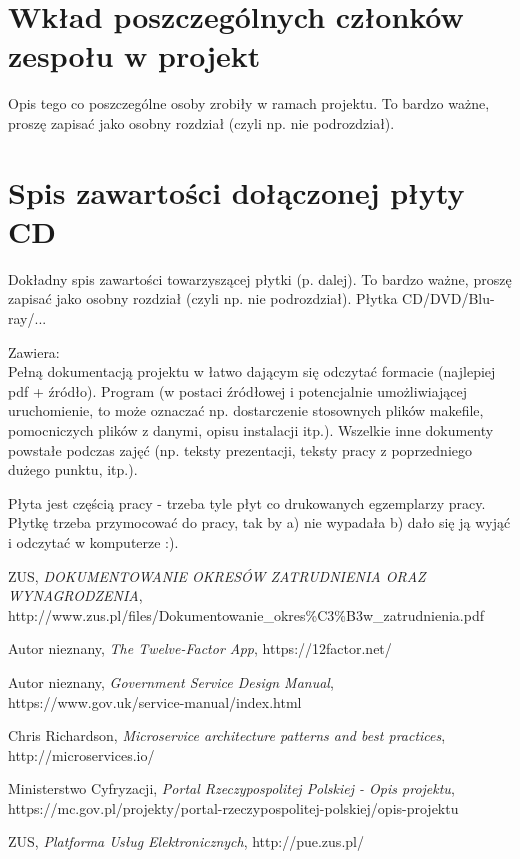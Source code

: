 \documentclass[licencjacka]{pracamgr}
\begin{document}
\chapter{Wkład poszczególnych członków zespołu w projekt}\label{r:wklad}
Opis tego co poszczególne osoby zrobiły w ramach projektu. To bardzo ważne, proszę zapisać jako osobny rozdział (czyli np. nie podrozdział).

\appendix
\chapter{Spis zawartości dołączonej płyty CD}\label{r:spis}
Dokładny spis zawartości towarzyszącej płytki (p. dalej). To bardzo ważne, proszę zapisać jako osobny rozdział (czyli np. nie podrozdział). Płytka CD/DVD/Blu-ray/...

Zawiera:\\
Pełną dokumentacją projektu w łatwo dającym się odczytać formacie (najlepiej pdf + źródło).
Program (w postaci źródłowej i potencjalnie umożliwiającej uruchomienie, to może oznaczać np. dostarczenie stosownych plików makefile, pomocniczych plików z danymi, opisu instalacji itp.).
Wszelkie inne dokumenty powstałe podczas zajęć (np. teksty prezentacji, teksty pracy z poprzedniego dużego punktu, itp.).

Płyta jest częścią pracy - trzeba tyle płyt co drukowanych egzemplarzy pracy. Płytkę trzeba przymocować do pracy, tak by a) nie wypadała b) dało się ją wyjąć i odczytać w komputerze :).

\begin{thebibliography}{99}

 ZUS, \textit{DOKUMENTOWANIE OKRESÓW ZATRUDNIENIA ORAZ
	WYNAGRODZENIA}, http://www.zus.pl/files/Dokumentowanie\_okres\%C3\%B3w\_zatrudnienia.pdf

 Autor nieznany, \textit{The Twelve-Factor App}, https://12factor.net/

 Autor nieznany, \textit{Government Service Design Manual},
https://www.gov.uk/service-manual/index.html

 Chris Richardson, \textit{Microservice architecture patterns and best practices},
http://microservices.io/

 Ministerstwo Cyfryzacji, \textit{Portal Rzeczypospolitej Polskiej - Opis projektu},
https://mc.gov.pl/projekty/portal-rzeczypospolitej-polskiej/opis-projektu

 ZUS, \textit{Platforma Usług Elektronicznych},
http://pue.zus.pl/

\end{thebibliography}
\end{document}
